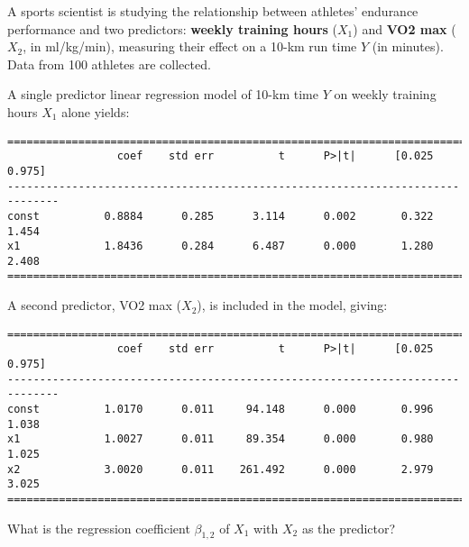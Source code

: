 \begin{exercise}[\ding{111}]

A sports scientist is studying the relationship between athletes' endurance performance and two predictors: \textbf{weekly training hours} (\(X_1\)) and \textbf{VO2 max} (\(X_2\), in ml/kg/min), measuring their effect on a 10-km run time \(Y\) (in minutes). Data from 100 athletes are collected.

A single predictor linear regression model of 10-km time \(Y\) on weekly training hours \(X_1\) alone yields:

\begin{verbatim}
==============================================================================
                 coef    std err          t      P>|t|      [0.025      0.975]
------------------------------------------------------------------------------
const          0.8884      0.285      3.114      0.002       0.322       1.454
x1             1.8436      0.284      6.487      0.000       1.280       2.408
==============================================================================
\end{verbatim}

A second predictor, VO2 max (\(X_2\)), is included in the model, giving:

\begin{verbatim}
==============================================================================
                 coef    std err          t      P>|t|      [0.025      0.975]
------------------------------------------------------------------------------
const          1.0170      0.011     94.148      0.000       0.996       1.038
x1             1.0027      0.011     89.354      0.000       0.980       1.025
x2             3.0020      0.011    261.492      0.000       2.979       3.025
==============================================================================
\end{verbatim}
What is the regression coefficient $\beta_{1,2}$ of $X_1$ with $X_2$ as the predictor? 
\end{exercise}


 





